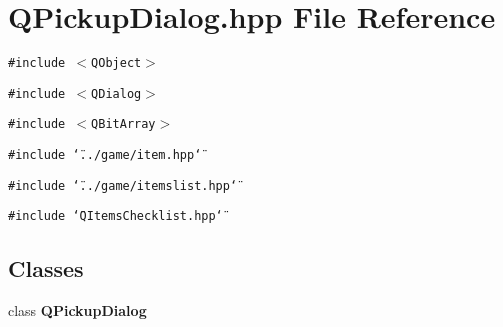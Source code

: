 \section{QPickup\-Dialog.hpp File Reference}
\label{QPickupDialog_8hpp}
{\tt \#include $<$QObject$>$}\par
{\tt \#include $<$QDialog$>$}\par
{\tt \#include $<$QBit\-Array$>$}\par
{\tt \#include \char`\"{}../game/item.hpp\char`\"{}}\par
{\tt \#include \char`\"{}../game/itemslist.hpp\char`\"{}}\par
{\tt \#include \char`\"{}QItems\-Checklist.hpp\char`\"{}}\par
\subsection*{Classes}
\begin{CompactItemize}
\item 
class {\bf QPickup\-Dialog}
\end{CompactItemize}
